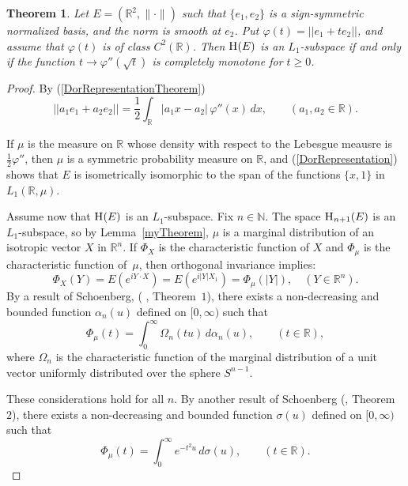 \documentclass{article}[1100]
\newtheorem{theorem}{Theorem}[section]
\theoremstyle{definition}
\theoremstyle{remark}
\newcommand\Ren[1]{\mathbb{R}^{#1}}
\newcommand\ar{\mathbb{R}}
\newcommand\norma[1]{|\!|#1|\!|}
\newcommand\mySpaceH[1]{\textsc{H}(#1)}
\newcommand\mySpace[2]{\textsc{H}_{#1}(#2)}
\newcommand\sphere[1]{S^{#1}}
\begin{document}
\begin{tcolorbox}
\begin{theorem}\label{theCorollary}
Let $E=(\Ren{2},\|\cdot\|)$ such that $\{e_1,e_2\}$ is a sign-symmetric normalized basis, and the norm is smooth at $e_2$.
Put $\varphi(t)=\norma{e_1+te_2}$, and assume that $\varphi(t)$ is of class $C^2(\mathbb{R})$.
Then  $\mySpaceH{E}$ is an $L_1$-subspace if and only if the function $t\to\varphi''(\sqrt{t})$ is completely monotone for  $t\geq 0$.
\end{theorem}
\end{tcolorbox}
\begin{proof}
By (\ref{DorRepresentationTheorem})
\begin{equation}\label{DorRepresentation}
 \norma{a_1e_1+a_2e_2}=\frac{1}{2}\int_\ar |a_1x-a_2|\,\varphi''(x)\,dx, \qquad (a_1,a_2\in\ar). 
 \end{equation}

If $\mu$ is the measure on $\ar$ whose density with respect to the Lebesgue meausre is $\frac{1}{2}\varphi''$, then $\mu$ is a symmetric probability measure on $\ar$, and
(\ref{DorRepresentation}) shows that $E$ is isometrically isomorphic to the span of the functions $\{x,1\}$ in $L_1(\ar,\mu)$.  

\medskip

Assume now that $\mySpaceH{E}$ is an $L_1$-subspace. Fix $n\in\mathbb{N}$. The space  $\mySpace{n+1}{E}$ is an $L_1$-subspace, so by Lemma~\ref{myTheorem}, $\mu$ is a marginal distribution of an isotropic vector $X$ in $\Ren{n}$. If $\Phi_X$ is the characteristic function of $X$ and $\Phi_\mu$ is the characteristic function of~$\mu$, then orthogonal invariance implies:
\[ \Phi_X(Y)=E(e^{i Y\cdot X})=E(e^{i|Y|X_1})=\Phi_\mu(|Y|),\quad (Y\in\Ren{n}).\]
By a result of Schoenberg, (\cite{Schoenberg} , Theorem~$1$),   there exists a non-decreasing and bounded function $\alpha_n(u)$ defined on $[0,\infty)$ such that
\begin{equation}\label{finiteDimCFunctionRep}
\Phi_\mu(t)=\int_0^\infty \Omega_n(tu)\,d\alpha_n(u),\qquad (t\in\ar),
\end{equation}
where $\Omega_n$ is the characteristic function of the marginal distribution of a unit vector uniformly distributed over the sphere $\sphere{n-1}$. 

These considerations hold for all $n$. By another result of Schoenberg (\cite{Schoenberg}, Theorem~$2$),  there exists a non-decreasing and bounded function $\sigma(u)$ defined on $[0,\infty)$ such that
\begin{equation}\label{infiniteDimCFunctionRep}
\Phi_\mu(t)=\int_0^\infty e^{-t^2u}\,d\sigma(u), \qquad (t\in\ar).
\end{equation}


\end{proof}
\end{document}
